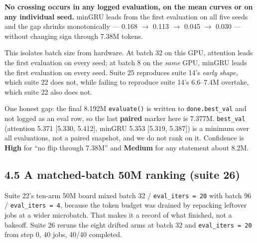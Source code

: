 \textbf{No crossing occurs in any logged evaluation, on the mean curves or on any individual seed.}
minGRU leads from the first evaluation on all five seeds and the gap shrinks monotonically ---
0.168 $\rightarrow$ 0.113 $\rightarrow$ 0.045 $\rightarrow$ 0.030 --- without changing sign through 7.38M tokens.

This isolates batch size from hardware. At batch 32 on this GPU, attention leads the first
evaluation on every seed; at batch 8 on the \emph{same} GPU, minGRU leads the first evaluation on
every seed. Suite 25 reproduces suite 14's \emph{early shape}, which suite 22 does not, while failing
to reproduce suite 14's 6.6--7.4M overtake, which suite 22 also does not.

One honest gap: the final 8.192M \texttt{evaluate()} is written to \texttt{done.best\_val} and not logged as an
eval row, so the last \textbf{paired} marker here is 7.377M. \texttt{best\_val} (attention 5.371 {[}5.330,
5.412{]}, minGRU 5.353 {[}5.319, 5.387{]}) is a minimum over all evaluations, not a paired snapshot,
and we do not rank on it. Confidence is \textbf{High} for ``no flip through 7.38M'' and \textbf{Medium} for
any statement about 8.2M.

\subsection{4.5 A matched-batch 50M ranking (suite 26)}\label{a-matched-batch-50m-ranking-suite-26}

Suite 22's ten-arm 50M board mixed batch 32 / \texttt{eval\_iters\ =\ 20} with batch 96 / \texttt{eval\_iters\ =\ 4},
because the token budget was drained by repacking leftover jobs at a wider microbatch. That makes
it a record of what finished, not a bakeoff. Suite 26 reruns the eight drifted arms at batch 32
and \texttt{eval\_iters\ =\ 20} from step 0, 40 jobs, 40/40 completed.

